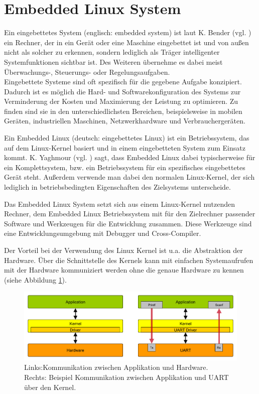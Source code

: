 \newpage

\section{Embedded Linux System}
\label{section_EmbeddedLinux}

Ein eingebettetes System (englisch: embedded system) ist laut  K. Bender (vgl. \cite{bender2005embedded}) ein Rechner, der in ein Gerät oder eine Maschine eingebettet ist und von außen nicht als solcher zu erkennen, sondern lediglich als Träger intelligenter Systemfunktionen sichtbar ist. Des Weiteren übernehme es dabei meist Überwachungs-, Steuerungs- oder Regelungsaufgaben.\\
Eingebettete Systeme sind oft spezifisch für die gegebene Aufgabe konzipiert. Dadurch ist es möglich die Hard- und Softwarekonfiguration des Systems zur Verminderung der Kosten und Maximierung der Leistung zu optimieren. Zu finden sind sie in den unterschiedlichsten Bereichen, beispielsweise in mobilen Geräten, industriellen Maschinen, Netzwerkhardware und Verbrauchergeräten.\ 

Ein Embedded Linux (deutsch: eingebettetes Linux) ist ein Betriebssystem, das auf dem Linux-Kernel basiert und in einem eingebetteten System zum Einsatz kommt. K. Yaghmour (vgl. \cite{yaghmour2008building}) sagt, dass Embedded Linux dabei typischerweise für ein Komplettsystem, bzw. ein Betriebssystem für ein spezifisches eingebettetes Gerät steht. Außerdem verwende man dabei den normalen Linux-Kernel, der sich lediglich in betriebsbedingten Eigenschaften des Zielsystems unterscheide.\ 

Das Embedded Linux System setzt sich aus einem Linux-Kernel nutzenden Rechner, dem Embedded Linux Betriebssystem mit für den Zielrechner passender Software und Werkzeugen für die Entwicklung zusammen. Diese Werkzeuge sind eine Entwicklungsumgebung mit Debugger und Cross-Compiler.

Der Vorteil bei der Verwendung des Linux Kernel ist u.a. die Abstraktion der Hardware. Über die Schnittstelle des Kernels kann mit einfachen Systemaufrufen mit der Hardware kommuniziert werden ohne die genaue Hardware zu kennen (siehe Abbildung \ref{figure_KernelHardwareLayer}).\\

\begin{figure}[h]
\begin{center}
\includegraphics[width=\textwidth]{img/general/Kernel_Hardware_Layer.pdf}
\caption{Links:Kommunikation zwischen Applikation und Hardware.\\Rechts: Beispiel Kommunikation zwischen Applikation und UART über den Kernel.}
\label{figure_KernelHardwareLayer}
\end{center}
\end{figure}